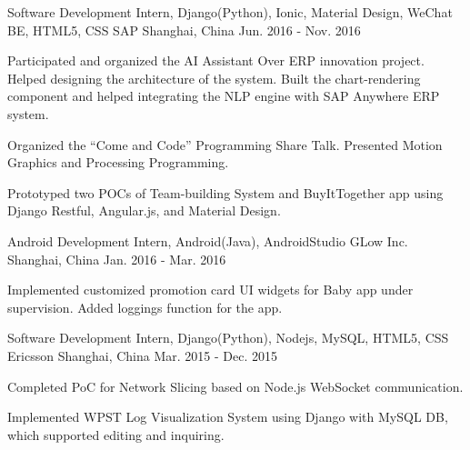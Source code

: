 \begin{cventries}
\cventry
{Software Development Intern, Django(Python), Ionic, Material Design, WeChat BE, HTML5, CSS} %
{SAP} %
{Shanghai, China} %
{Jun. 2016 - Nov. 2016} %
{ %
\begin{cvitems}
\item {Participated and organized the AI Assistant Over ERP innovation project. Helped designing the architecture of the system. Built the chart-rendering component and helped integrating the NLP engine with SAP Anywhere ERP system.}
\item {Organized the “Come and Code” Programming Share Talk. Presented Motion Graphics and Processing Programming.}
\item {Prototyped two POCs of Team-building System and BuyItTogether app using Django Restful, Angular.js, and Material Design.}
\end{cvitems}
}


\cventry
{Android Development Intern, Android(Java), AndroidStudio} %
{GLow Inc.} %
{Shanghai, China} %
{Jan. 2016 - Mar. 2016} %
{ %
\begin{cvitems}
\item {Implemented customized promotion card UI widgets for Baby app under supervision. Added loggings function for the app.}
\end{cvitems}
}


\cventry
{Software Development Intern, Django(Python), Nodejs, MySQL, HTML5, CSS} %
{Ericsson} %
{Shanghai, China} %
{Mar. 2015 - Dec. 2015} %
{ %
\begin{cvitems}
\item {Completed PoC for Network Slicing based on Node.js WebSocket communication.}
\item {Implemented WPST Log Visualization System using Django with MySQL DB, which supported editing and inquiring.}
\end{cvitems}
}


\end{cventries}
